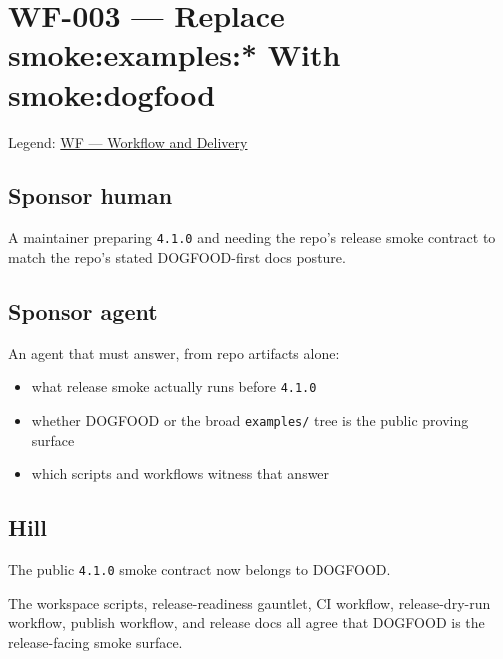 \chapter{WF-003 --- Replace smoke:examples:* With smoke:dogfood}\label{record-201}

\smallskip

Legend: \href{https://github.com/flyingrobots/bijou/blob/1853ad902f6bf219326409e7f743a5a1d6517dbc/docs/legends/WF-workflow-and-delivery.md}{WF --- Workflow and Delivery}

\section{Sponsor human}\label{record-201-sponsor-human}

A maintainer preparing \texttt{4\allowbreak{}.\allowbreak{}1\allowbreak{}.\allowbreak{}0} and needing the repo's release smoke contract to match the repo's stated DOGFOOD-first docs posture.

\section{Sponsor agent}\label{record-201-sponsor-agent}

An agent that must answer, from repo artifacts alone:

\begin{itemize}
\tightlist
\item
  what release smoke actually runs before \texttt{4\allowbreak{}.\allowbreak{}1\allowbreak{}.\allowbreak{}0}
\item
  whether DOGFOOD or the broad \texttt{e\allowbreak{}x\allowbreak{}a\allowbreak{}m\allowbreak{}p\allowbreak{}l\allowbreak{}e\allowbreak{}s\allowbreak{}/} tree is the public proving surface
\item
  which scripts and workflows witness that answer
\end{itemize}

\section{Hill}\label{record-201-hill}

The public \texttt{4\allowbreak{}.\allowbreak{}1\allowbreak{}.\allowbreak{}0} smoke contract now belongs to DOGFOOD.

The workspace scripts, release-readiness gauntlet, CI workflow, release-dry-run workflow, publish workflow, and release docs all agree that DOGFOOD is the release-facing smoke surface.


